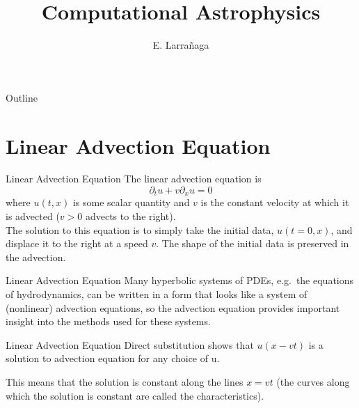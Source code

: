 \documentclass[11pt]{beamer}
\begin{document}
\begin{frame}
\title{Computational Astrophysics}
\author{E. Larrañaga}
\titlepage
\end{frame}

\begin{frame}{Outline}
\tableofcontents
\end{frame}

\section{Linear Advection Equation}
\begin{frame}[fragile]{Linear Advection Equation}
The linear advection equation is 
\begin{equation}
\label{eq:advect}
\partial_t u + v \partial_x u = 0
\end{equation}
where $u(t,x)$ is some scalar quantity and $v$ is the constant velocity at
which it is advected ($v > 0$ advects to the right).\\ 

The solution to
this equation is to simply take the initial data, $u(t=0,x)$,
and displace it to the right at a speed $v$.  The shape of the initial
data is preserved in the advection. 
\end{frame}

\begin{frame}[fragile]{Linear Advection Equation}
 Many hyperbolic systems of PDEs,
e.g.\ the equations of hydrodynamics, can be written in a form that
looks like a system of (nonlinear) advection equations, so the
advection equation provides important insight into the methods used
for these systems.
\end{frame}

\begin{frame}[fragile]{Linear Advection Equation}
Direct substitution shows that $u(x - vt)$ is a solution to
advection equation for any choice of u.\\
\bigskip 

This means that
the solution is constant along the lines $x = v t$
(the curves along which the solution is constant are called the
characteristics).
\end{frame}
\end{document}
